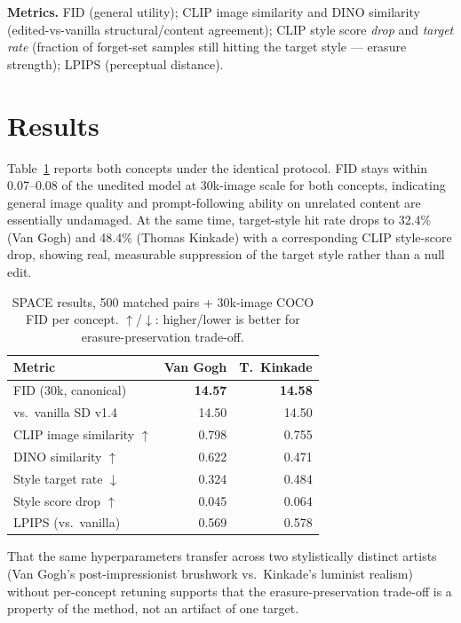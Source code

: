 \documentclass[10pt,twocolumn]{article}
\begin{document}
\textbf{Metrics.} FID (general utility); CLIP image similarity and DINO similarity (edited-vs-vanilla structural/content agreement); CLIP style score \emph{drop} and \emph{target rate} (fraction of forget-set samples still hitting the target style --- erasure strength); LPIPS (perceptual distance).

\section{Results}
Table~\ref{tab:results} reports both concepts under the identical protocol. FID stays within 0.07--0.08 of the unedited model at 30k-image scale for both concepts, indicating general image quality and prompt-following ability on unrelated content are essentially undamaged. At the same time, target-style hit rate drops to 32.4\% (Van Gogh) and 48.4\% (Thomas Kinkade) with a corresponding CLIP style-score drop, showing real, measurable suppression of the target style rather than a null edit.

\begin{table}[h]
\centering\small
\setlength{\tabcolsep}{3.2pt}
\begin{tabular}{lrr}
\toprule
\textbf{Metric} & \textbf{Van Gogh} & \textbf{T.\ Kinkade} \\
\midrule
FID (30k, canonical) & \textbf{14.57} & \textbf{14.58} \\
\quad vs.\ vanilla SD v1.4~\cite{esd} & 14.50 & 14.50 \\
CLIP image similarity $\uparrow$ & 0.798 & 0.755 \\
DINO similarity $\uparrow$ & 0.622 & 0.471 \\
Style target rate $\downarrow$ & 0.324 & 0.484 \\
Style score drop $\uparrow$ & 0.045 & 0.064 \\
LPIPS (vs.\ vanilla) & 0.569 & 0.578 \\
\bottomrule
\end{tabular}
\caption{SPACE results, 500 matched pairs + 30k-image COCO FID per concept. $\uparrow$/$\downarrow$: higher/lower is better for erasure-preservation trade-off.}
\label{tab:results}
\vspace{-0.5em}
\end{table}

That the same hyperparameters transfer across two stylistically distinct artists (Van Gogh's post-impressionist brushwork vs.\ Kinkade's luminist realism) without per-concept retuning supports that the erasure-preservation trade-off is a property of the method, not an artifact of one target.
\end{document}

